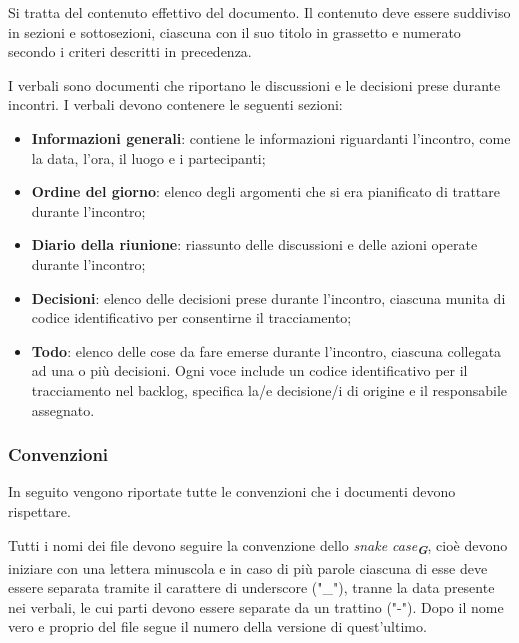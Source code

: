 Si tratta del contenuto effettivo del documento. Il contenuto deve essere suddiviso in sezioni
e sottosezioni, ciascuna con il suo titolo in grassetto e numerato secondo i criteri descritti in
precedenza.

I verbali sono documenti che riportano le discussioni e le decisioni prese durante incontri.
I verbali devono contenere le seguenti sezioni:
\begin{itemize}
    \item \textbf{Informazioni generali}: contiene le informazioni riguardanti l’incontro, come la data, l’ora, il luogo e i partecipanti;
    \item \textbf{Ordine del giorno}: elenco degli argomenti che si era pianificato di trattare durante l’incontro;
    \item \textbf{Diario della riunione}: riassunto delle discussioni e delle azioni operate durante l’incontro;
    \item \textbf{Decisioni}: elenco delle decisioni prese durante l’incontro, ciascuna munita di codice identificativo per consentirne il tracciamento;
    \item \textbf{Todo}: elenco delle cose da fare emerse durante l'incontro, ciascuna collegata ad una o più decisioni. Ogni voce include un codice 
    identificativo per il tracciamento nel backlog, specifica la/e decisione/i di origine e il responsabile assegnato.
\end{itemize}


\subsubsection{Convenzioni}
In seguito vengono riportate tutte le convenzioni che i documenti devono rispettare.

Tutti i nomi dei file devono seguire la convenzione dello \emph{snake case}\textsubscript{\textit{\textbf{G}}}, 
cioè devono iniziare con una lettera minuscola e in caso di più parole ciascuna di esse deve essere separata tramite
il carattere di underscore ("\_"), tranne la data presente nei verbali, le cui parti devono essere separate da un trattino ("-"). Dopo il nome 
vero e proprio del file segue il numero della versione di quest’ultimo.

